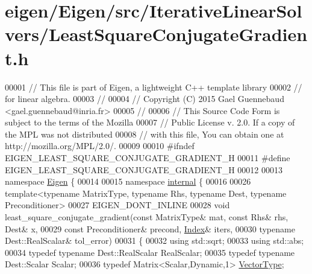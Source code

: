 \hypertarget{eigen_2_eigen_2src_2_iterative_linear_solvers_2_least_square_conjugate_gradient_8h_source}{}\section{eigen/\+Eigen/src/\+Iterative\+Linear\+Solvers/\+Least\+Square\+Conjugate\+Gradient.h}
\label{eigen_2_eigen_2src_2_iterative_linear_solvers_2_least_square_conjugate_gradient_8h_source}

\begin{DoxyCode}
00001 \textcolor{comment}{// This file is part of Eigen, a lightweight C++ template library}
00002 \textcolor{comment}{// for linear algebra.}
00003 \textcolor{comment}{//}
00004 \textcolor{comment}{// Copyright (C) 2015 Gael Guennebaud <gael.guennebaud@inria.fr>}
00005 \textcolor{comment}{//}
00006 \textcolor{comment}{// This Source Code Form is subject to the terms of the Mozilla}
00007 \textcolor{comment}{// Public License v. 2.0. If a copy of the MPL was not distributed}
00008 \textcolor{comment}{// with this file, You can obtain one at http://mozilla.org/MPL/2.0/.}
00009 
00010 \textcolor{preprocessor}{#ifndef EIGEN\_LEAST\_SQUARE\_CONJUGATE\_GRADIENT\_H}
00011 \textcolor{preprocessor}{#define EIGEN\_LEAST\_SQUARE\_CONJUGATE\_GRADIENT\_H}
00012 
00013 \textcolor{keyword}{namespace }\hyperlink{namespace_eigen}{Eigen} \{ 
00014 
00015 \textcolor{keyword}{namespace }\hyperlink{namespaceinternal}{internal} \{
00016 
00026 \textcolor{keyword}{template}<\textcolor{keyword}{typename} MatrixType, \textcolor{keyword}{typename} Rhs, \textcolor{keyword}{typename} Dest, \textcolor{keyword}{typename} Preconditioner>
00027 EIGEN\_DONT\_INLINE
00028 \textcolor{keywordtype}{void} least\_square\_conjugate\_gradient(\textcolor{keyword}{const} MatrixType& mat, \textcolor{keyword}{const} Rhs& rhs, Dest& x,
00029                                      \textcolor{keyword}{const} Preconditioner& precond, \hyperlink{namespace_eigen_a62e77e0933482dafde8fe197d9a2cfde}{Index}& iters,
00030                                      \textcolor{keyword}{typename} Dest::RealScalar& tol\_error)
00031 \{
00032   \textcolor{keyword}{using} std::sqrt;
00033   \textcolor{keyword}{using} std::abs;
00034   \textcolor{keyword}{typedef} \textcolor{keyword}{typename} Dest::RealScalar RealScalar;
00035   \textcolor{keyword}{typedef} \textcolor{keyword}{typename} Dest::Scalar Scalar;
00036   \textcolor{keyword}{typedef} Matrix<Scalar,Dynamic,1> \hyperlink{struct_vector_type}{VectorType};

\end{DoxyCode}
